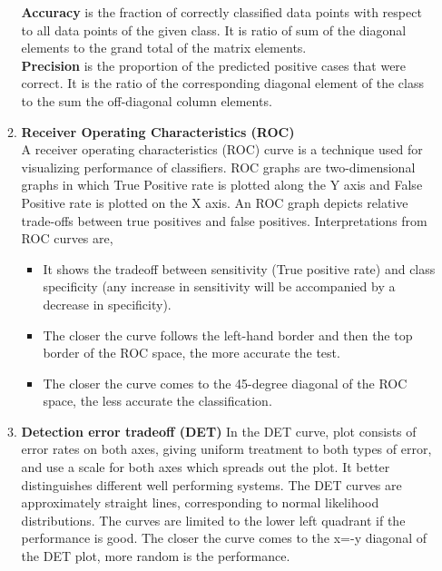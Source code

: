 \documentclass[11pt,paper=a4,answers]{exam}
\begin{document}
\begin{questions}
\begin{enumerate}[i.]
\begin{enumerate}
                    \textbf{Accuracy} is the fraction of correctly classified data points with respect to all data points of the given class. It is ratio of sum of the diagonal elements to the grand total of the matrix elements.\\
                    \textbf{Precision} is the proportion of the predicted positive cases that were correct. It is the ratio of the corresponding diagonal element of the class to the sum the off-diagonal column elements.
                \item \textbf{Receiver Operating Characteristics (ROC)}\\
                    A receiver operating characteristics (ROC) curve is a technique used for visualizing performance of classifiers. ROC graphs are two-dimensional graphs in which True Positive rate is plotted along the Y axis and False Positive rate is plotted on the X axis. An ROC graph depicts relative trade-offs between true positives and false positives. Interpretations from ROC curves are,
                    \begin{itemize}
                        \item It shows the tradeoff between sensitivity (True positive rate) and class specificity (any increase in sensitivity will be accompanied by a decrease in specificity).
                        \item The closer the curve follows the left-hand border and then the top border of the ROC space, the more accurate the test.
                        \item The closer the curve comes to the 45-degree diagonal of the ROC space, the less accurate the classification.
                    \end{itemize}
                \item \textbf{Detection error tradeoff (DET)}
                    In the DET curve, plot consists of error rates on both axes, giving uniform treatment to both types of error, and use a scale for both axes which spreads out the plot. It better distinguishes different well performing systems. The DET curves are approximately straight lines, corresponding to normal likelihood distributions. The curves are limited to the lower left quadrant if the performance is good. The closer the curve comes to the x=-y diagonal of the DET plot, more random is the performance.
            \end{enumerate}
                

\end{enumerate}
\end{questions}
\end{document}
